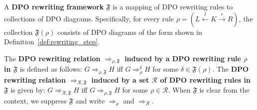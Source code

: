     
\begin{definition}
    A \textbf{DPO rewriting framework} $\mathfrak{F}$ is a mapping of DPO rewriting rules to collections of DPO diagrams. Specifically, for every rule \( \rho = (L \overset{l}{\leftarrow} K \overset{r}{\rightarrow} R) \), the collection $\mathfrak{F}(\rho)$ consists of DPO diagrams of the form shown in Definition~\ref{def:rewriting_step}.

    The \textbf{DPO rewriting relation $\Rightarrow_{\rho,\mathfrak{F}}$ induced by a DPO rewriting rule $\rho$ in $\mathfrak{F}$} is defined as follows: $G \Rightarrow_{\rho,\mathfrak{F}} H$ iff $G \Rightarrow_\rho^\delta H$ for some $\delta \in \mathfrak{F}(\rho)$. 
     The \textbf{DPO rewriting relation $\Rightarrow_{\mathcal{R},\mathfrak{F}}$ induced by a set $\mathcal{R}$ of DPO rewriting rules in $\mathfrak{F}$} is given by: $G \Rightarrow_{\mathcal{R},\mathfrak{F}} H$ iff $G \Rightarrow_{\rho,\mathfrak{F}} H$ for some $\rho \in \mathcal{R}$. When $\mathfrak{F}$ is clear from the context, we 
    suppress $\mathfrak{F}$ and 
    write $\Rightarrow_{\rho}$ and $\Rightarrow_{\mathcal{R}}$.
  \end{definition}